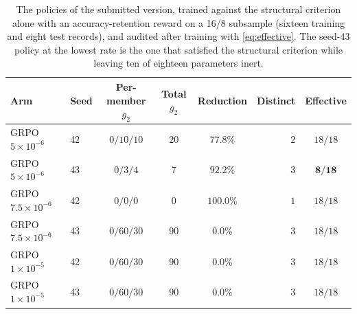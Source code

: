 \begin{table}[t]
\centering
\caption{The policies of the submitted version, trained against the structural criterion
alone with an accuracy-retention reward on a 16/8 subsample (sixteen training and eight
test records), and audited after training with \eqref{eq:effective}. The seed-43 policy at the lowest rate is the one that satisfied the
structural criterion while leaving ten of eighteen parameters inert.}
\label{tab:compstructure-pre}
\begin{tabular}{@{}llcccrc@{}}
\toprule
Arm & Seed & Per-member $g_2$ & Total $g_2$ & Reduction & Distinct & Effective \\
\midrule
GRPO $5\times10^{-6}$ & 42 & $0/10/10$ & $20$ & $77.8\%$ & $2$ & $18/18$ \\
GRPO $5\times10^{-6}$ & 43 & $0/3/4$ & $7$ & $92.2\%$ & $3$ & $\mathbf{8/18}$ \\
GRPO $7.5\times10^{-6}$ & 42 & $0/0/0$ & $0$ & $100.0\%$ & $1$ & $18/18$ \\
GRPO $7.5\times10^{-6}$ & 43 & $0/60/30$ & $90$ & $0.0\%$ & $3$ & $18/18$ \\
GRPO $1\times10^{-5}$ & 42 & $0/60/30$ & $90$ & $0.0\%$ & $3$ & $18/18$ \\
GRPO $1\times10^{-5}$ & 43 & $0/60/30$ & $90$ & $0.0\%$ & $3$ & $18/18$ \\
\bottomrule
\end{tabular}
\end{table}
